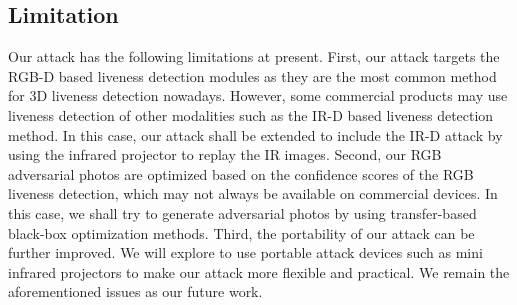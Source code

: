 \subsection{Limitation}
Our attack has the following limitations at present. 
First, our attack targets the RGB-D based liveness detection modules as they are the most common method for 3D liveness detection nowadays. However, some commercial products may use liveness detection of other modalities such as the IR-D based liveness detection method. In this case, our attack shall be extended to include the IR-D attack by using the infrared projector to replay the IR images.
Second, our RGB adversarial photos are optimized based on the confidence scores of the RGB liveness detection, which may not always be available on commercial devices. In this case, we shall try to generate adversarial photos by using transfer-based black-box optimization methods.
Third, the portability of our attack can be further improved. We will explore to use portable attack devices such as mini infrared projectors to make our attack more flexible and practical. We remain the aforementioned issues as our future work.
